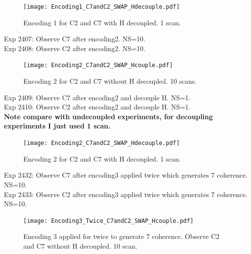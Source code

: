 \begin{figure}[htb]
\begin{center}
\texttt{[image: Encoding1\_C7andC2\_SWAP\_Hdecouple.pdf]}
\end{center}
\setlength{\abovecaptionskip}{-0.35cm}
\caption{\footnotesize{Encoding 1 for C2 and C7 with H decoupled. 1 scan.}}\label{2405and2406}
\end{figure}

\clearpage
Exp 2407: Observe C7 after encoding2. NS=10.\\
Exp 2408: Observe C2 after encoding2. NS=10.\\

\begin{figure}[htb]
\begin{center}
\texttt{[image: Encoding2\_C7andC2\_SWAP\_Hcouple.pdf]}
\end{center}
\setlength{\abovecaptionskip}{-0.35cm}
\caption{\footnotesize{Encoding 2 for C2 and C7 without H decoupled. 10 scans.}}\label{2407and2408}
\end{figure}

\clearpage
Exp 2409: Observe C7 after encoding2 and decouple H. NS=1.\\
Exp 2410: Observe C2 after encoding2 and decouple H. NS=1.\\
\textbf{Note compare with undecoupled experiments, for decoupling experiments I just used 1 scan.}

\begin{figure}[htb]
\begin{center}
\texttt{[image: Encoding2\_C7andC2\_SWAP\_Hdecouple.pdf]}
\end{center}
\setlength{\abovecaptionskip}{-0.35cm}
\caption{\footnotesize{Encoding 2 for C2 and C7 with H decoupled. 1 scan.}}\label{2409and2410}
\end{figure}

\clearpage
Exp 2432: Observe C7 after encoding3 applied twice which generates 7 coherence. NS=10.\\
Exp 2433: Observe C2 after encoding3 applied twice which generates 7 coherence. NS=10.\\

\begin{figure}[htb]
\begin{center}
\texttt{[image: Encoding3\_Twice\_C7andC2\_SWAP\_Hcouple.pdf]}
\end{center}
\setlength{\abovecaptionskip}{-0.35cm}
\caption{\footnotesize{Encoding 3 applied for twice to generate 7 coherence. Observe C2 and C7 without H decoupled. 10 scan.}}\label{2432and2433}
\end{figure}

